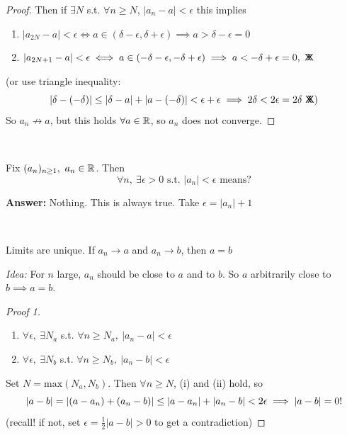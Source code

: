 \documentclass[twoside]{scrartcl}
\newcommand*{\cont}{%
  \mathsf{X}\mkern-8.5mu\mathsf{X}%
}
\begin{document}
\begin{example}
\begin{proof}
 Then if $\exists N$ s.t. $\forall n \geq N$, $|a_n - a| <\epsilon$ this implies
\begin{enumerate}
\item $|a_{2N} - a | < \epsilon \iff a \in (\delta - \epsilon, \delta + \epsilon)\implies a > \delta - \epsilon =0$ 
\item $|a_{2N+1} - a | < \epsilon\iff a \in (-\delta - \epsilon,-\delta + \epsilon) \implies a < -\delta + \epsilon = 0,~\cont$ 
\end{enumerate}
(or use triangle inequality: \[|\delta - (-\delta)| \leq |\delta - a| + |a -(-\delta)| < \epsilon + \epsilon \implies 2\delta < 2\epsilon = 2\delta ~\cont\text{)}\]
So $a_n \not\to a$, but this holds $\forall a \in \mathbb{R}$, so $a_n$ does not converge.
\end{proof}
\end{example}~

\begin{clicker}
Fix $(a_n)_{n\geq 1},~a_n \in \mathbb{R}$. Then \[\forall n,~\exists \epsilon >0 \text{ s.t. } |a_n| < \epsilon \text{ means?}\]

\textbf{Answer:} Nothing. This is always true. Take $\epsilon = |a_n| + 1$	
\end{clicker}~


\begin{theorem}
Limits are unique. If $a_n \to a$ and $a_n \to b$, then $a=b$	
\end{theorem}

\emph{Idea:} For $n$ large, $a_n$ should be close to $a$ and to $b$. So $a$ arbitrarily close to $b \implies a = b$. 

\begin{proof}[Proof 1]~
\begin{enumerate}
\item $\forall \epsilon,~\exists N_a$ s.t. $\forall n \geq N_a,~|a_n - a| < \epsilon$ 

\item $\forall \epsilon,~\exists N_b$ s.t. $\forall n \geq N_b,~|a_n - b| < \epsilon$
\end{enumerate}

Set $N = \mathrm{max}(N_a,N_b)$. Then $\forall n \geq N$, (i) and (ii) hold, so
\[|a - b| = |(a-a_n) + (a_n - b)| \leq |a - a_n| + |a_n - b| < 2\epsilon \implies |a-b| = 0!\qedhere\]
(recall! if not, set $\epsilon = \frac{1}{2}|a-b| >0$ to get a contradiction)
\end{proof}~
\end{document}
